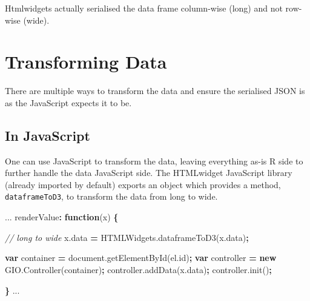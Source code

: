 \documentclass[
]{krantz}
\makeatletter
\newenvironment{Shaded}{\begin{snugshade}}{\end{snugshade}}
\newcommand{\AttributeTok}[1]{\textcolor[rgb]{0.61,0.61,0.61}{#1}}
\newcommand{\CommentTok}[1]{\textcolor[rgb]{0.37,0.37,0.37}{\textit{#1}}}
\newcommand{\KeywordTok}[1]{\textcolor[rgb]{0.27,0.27,0.27}{\textbf{#1}}}
\newcommand{\NormalTok}[1]{#1}
\newcommand{\OperatorTok}[1]{\textcolor[rgb]{0.43,0.43,0.43}{\textbf{#1}}}
\newcommand{\VariableTok}[1]{\textcolor[rgb]{0,0,0}{#1}}
\newenvironment{kframe}{%
\medskip{}
\setlength{\fboxsep}{.8em}
 \def\at@end@of@kframe{}%
 \ifinner\ifhmode%
  \def\at@end@of@kframe{\end{minipage}}%
  \begin{minipage}{\columnwidth}%
 \fi\fi%
 \def\FrameCommand##1{\hskip\@totalleftmargin \hskip-\fboxsep
 \colorbox{shadecolor}{##1}\hskip-\fboxsep
     \hskip-\linewidth \hskip-\@totalleftmargin \hskip\columnwidth}%
 \MakeFramed {\advance\hsize-\width
   \@totalleftmargin\z@ \linewidth\hsize
   \@setminipage}}%
 {\par\unskip\endMakeFramed%
 \at@end@of@kframe}
\renewenvironment{Shaded}{\begin{kframe}}{\end{kframe}}
\makeatother
\begin{document}
Htmlwidgets actually serialised the data frame column-wise (long) and not row-wise (wide).

\hypertarget{transforming-data}{%
\section*{Transforming Data}\label{transforming-data}}


There are multiple ways to transform the data and ensure the serialised JSON is as the JavaScript expects it to be.

\hypertarget{in-javascript}{%
\subsection*{In JavaScript}\label{in-javascript}}


One can use JavaScript to transform the data, leaving everything as-is R side to further handle the data JavaScript side. The HTMLwidget JavaScript library (already imported by default) exports an object which provides a method, \texttt{dataframeToD3}, to transform the data from long to wide.

\begin{Shaded}
\begin{Highlighting}[]
\NormalTok{...}
\NormalTok{renderValue}\OperatorTok{:} \KeywordTok{function}\NormalTok{(x) }\OperatorTok{\{}

  \CommentTok{// long to wide}
  \VariableTok{x}\NormalTok{.}\AttributeTok{data} \OperatorTok{=} \VariableTok{HTMLWidgets}\NormalTok{.}\AttributeTok{dataframeToD3}\NormalTok{(}\VariableTok{x}\NormalTok{.}\AttributeTok{data}\NormalTok{)}\OperatorTok{;}

  \KeywordTok{var}\NormalTok{ container }\OperatorTok{=} \VariableTok{document}\NormalTok{.}\AttributeTok{getElementById}\NormalTok{(}\VariableTok{el}\NormalTok{.}\AttributeTok{id}\NormalTok{)}\OperatorTok{;}
  \KeywordTok{var}\NormalTok{ controller }\OperatorTok{=} \KeywordTok{new} \VariableTok{GIO}\NormalTok{.}\AttributeTok{Controller}\NormalTok{(container)}\OperatorTok{;}
  \VariableTok{controller}\NormalTok{.}\AttributeTok{addData}\NormalTok{(}\VariableTok{x}\NormalTok{.}\AttributeTok{data}\NormalTok{)}\OperatorTok{;} 
  \VariableTok{controller}\NormalTok{.}\AttributeTok{init}\NormalTok{()}\OperatorTok{;}

\OperatorTok{\}}
\NormalTok{...}
\end{Highlighting}
\end{Shaded}
\end{document}
